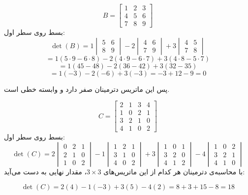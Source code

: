 	\begin{example}
			\[
		B =
		\begin{bmatrix}
			1 & 2 & 3 \\
			4 & 5 & 6 \\
			7 & 8 & 9
		\end{bmatrix}
		\]
		بسط روی سطر اول:
		\[
		\det(B) = 1 
		\begin{vmatrix}
			5 & 6 \\
			8 & 9
		\end{vmatrix}
		- 2 
		\begin{vmatrix}
			4 & 6 \\
			7 & 9
		\end{vmatrix}
		+ 3 
		\begin{vmatrix}
			4 & 5 \\
			7 & 8
		\end{vmatrix}
		\]
		\[
		= 1(5 \cdot 9 - 6 \cdot 8) - 2(4 \cdot 9 - 6 \cdot 7) + 3(4 \cdot 8 - 5 \cdot 7)
		\]
		\[
		= 1(45 - 48) - 2(36 - 42) + 3(32 - 35)
		\]
		\[
		= 1(-3) - 2(-6) + 3(-3) = -3 + 12 - 9 = 0
		\]
	\end{example}
	پس این ماتریس دترمینان صفر دارد و وابسته خطی است.
	\begin{example}

	\[
	C =
	\begin{bmatrix}
		2 & 1 & 3 & 4 \\
		1 & 0 & 2 & 1 \\
		3 & 2 & 1 & 0 \\
		4 & 1 & 0 & 2
	\end{bmatrix}
	\]
	بسط روی سطر اول:
	\[
	\det(C) =
	2
	\begin{vmatrix}
		0 & 2 & 1 \\
		2 & 1 & 0 \\
		1 & 0 & 2
	\end{vmatrix}
	- 1
	\begin{vmatrix}
		1 & 2 & 1 \\
		3 & 1 & 0 \\
		4 & 0 & 2
	\end{vmatrix}
	+ 3
	\begin{vmatrix}
		1 & 0 & 1 \\
		3 & 2 & 0 \\
		4 & 1 & 2
	\end{vmatrix}
	- 4
	\begin{vmatrix}
		1 & 0 & 2 \\
		3 & 2 & 1 \\
		4 & 1 & 0
	\end{vmatrix}
	\]
	با محاسبه‌ی دترمینان هر کدام از این ماتریس‌های \(3 \times 3\)، مقدار نهایی به دست می‌آید:
	
	\[
	\det(C) = 2(4) - 1(-3) + 3(5) - 4(2) = 8 + 3 + 15 - 8 = 18
	\]
\end{example}
